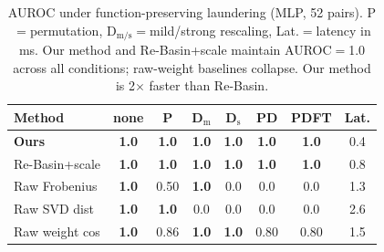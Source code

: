 \begin{table}[t]
\centering
\small
\setlength{\tabcolsep}{3pt}
\begin{tabular}{@{}lccccccc@{}}
\toprule
Method & none & P & D$_\mathrm{m}$ & D$_\mathrm{s}$ & PD & PDFT & Lat. \\
\midrule
\textbf{Ours} & \textbf{1.0} & \textbf{1.0} & \textbf{1.0} & \textbf{1.0} & \textbf{1.0} & \textbf{1.0} & 0.4 \\
Re-Basin+scale & \textbf{1.0} & \textbf{1.0} & \textbf{1.0} & \textbf{1.0} & \textbf{1.0} & \textbf{1.0} & 0.8 \\
Raw Frobenius & \textbf{1.0} & 0.50 & \textbf{1.0} & 0.0 & 0.0 & 0.0 & 1.3 \\
Raw SVD dist & \textbf{1.0} & \textbf{1.0} & 0.0 & 0.0 & 0.0 & 0.0 & 2.6 \\
Raw weight cos & \textbf{1.0} & 0.86 & \textbf{1.0} & \textbf{1.0} & 0.80 & 0.80 & 1.5 \\
\bottomrule
\end{tabular}
\caption{AUROC under function-preserving laundering (MLP, 52 pairs). P$=$permutation, D$_\mathrm{m/s}$$=$mild/strong rescaling, Lat.$=$latency in ms. Our method and Re-Basin+scale maintain AUROC$=$1.0 across all conditions; raw-weight baselines collapse. Our method is 2$\times$ faster than Re-Basin.}
\label{tab:laundering-unified}
\end{table}